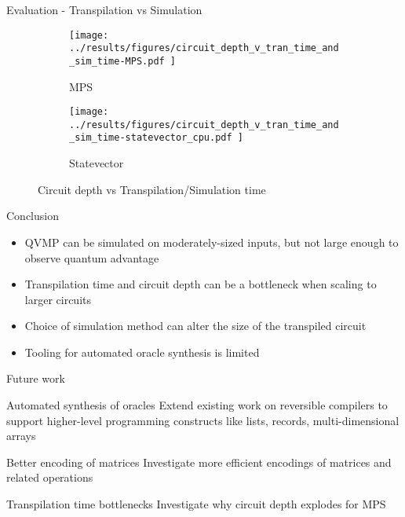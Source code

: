 \documentclass[10pt]{beamer}
\begin{document}
\begin{frame}{Evaluation - Transpilation vs Simulation}
  \begin{figure}
    \begin{subfigure}{0.48\textwidth}
      \centering
      \texttt{[image: 
          ../results/figures/circuit\_depth\_v\_tran\_time\_and\_sim\_time-MPS.pdf
      ]}
      \caption{MPS}
      \label{fig:circuit_depth_v_tran_time_and_sim_time-MPS}
    \end{subfigure}
    \begin{subfigure}{0.48\textwidth}
      \centering
      \texttt{[image: 
          ../results/figures/circuit\_depth\_v\_tran\_time\_and\_sim\_time-statevector\_cpu.pdf
      ]}
      \caption{Statevector}
      \label{fig:circuit_depth_v_tran_time_and_sim_time-statevector_cpu}
    \end{subfigure}
    \caption{Circuit depth vs Transpilation/Simulation time}
  \end{figure}
\end{frame}


\begin{frame}{Conclusion}
  \begin{itemize}
    \item QVMP can be simulated on moderately-sized inputs, but not large
      enough to observe quantum advantage
    \item Transpilation time and circuit depth can be a bottleneck when scaling to larger circuits
    \item Choice of simulation method can alter the size of the transpiled
      circuit
    \item Tooling for automated oracle synthesis is limited
  \end{itemize}
\end{frame}


\begin{frame}{Future work}
  \begin{exampleblock}{Automated synthesis of oracles}
    Extend existing work on reversible compilers to support higher-level
    programming constructs like lists, records, multi-dimensional arrays
  \end{exampleblock}
  \begin{exampleblock}{Better encoding of matrices}
    Investigate more efficient encodings of matrices and related operations
  \end{exampleblock}
  \begin{exampleblock}{Transpilation time bottlenecks}
    Investigate why circuit depth explodes for MPS
  \end{exampleblock}
\end{frame}
\end{document}
